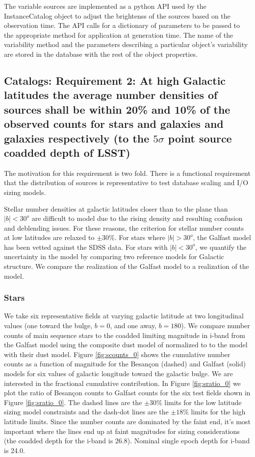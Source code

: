 \documentclass[]{article}
\begin{document}
{The variable sources are implemented as a python API used by the InstanceCatalog object to adjust the brightenss of the sources based on the observation time.
The API calls for a dictionary of parameters to be passed to the appropriate method for application at generation time.  The name of the variability method and
the parameters describing a particular object's variability are stored in the database with the rest of the object properties.

\subsection{Catalogs: Requirement 2: At high Galactic latitudes the
  average number densities of sources shall be within 20\%
  and 10\% 
  of the observed counts for stars and galaxies and galaxies
  respectively (to the $5\sigma$ point source coadded depth
  of LSST)}
The motivation for this requirement is two fold.  There is a functional requirement that the distribution of sources is representative
to test database scaling and I/O sizing models.  

Stellar number densities at galactic latitudes closer than to the plane than $|b| < 30^o$ are difficult to model due to the rising density and resulting confusion and deblending issues.
For these reasons, the criterion for stellar number counts at low latitudes are relaxed to $\pm 30\%$. 
For stars where $|b| > 30^o$, the Galfast model has been vetted against the SDSS data.  For stars with $|b| < 30^o$, we quantify the uncertainty in the model by comparing two reference models for Galactic structure.
We compare the realization of the Galfast model to a realization of the \citet{besancon} model.

\subsubsection{Stars}
We take six representative fields at varying galactic latitude at two longitudinal values (one toward the bulge, $b=0$, and one away, $b=180$).  
We compare number 
counts of main sequence stars to the coadded limiting magnitude in i-band 
 from the Galfast model using the composite dust model
of \citet{amores05} normalized to \citet{schlegel98} to the \citet{besancon} model with their dust model.  Figure \ref{fig:scounts_0} shows 
the cumulative number counts as a function of magnitude for the Besan\c{c}on (dashed) and Galfast (solid) models 
for six values of galactic longitude toward the galactic bulge.  We are interested in the
fractional cumulative contribution.  In Figure \ref{fig:sratio_0} we plot the ratio of Besan\c{c}on counts to Galfast counts for the six test fields shown in Figure \ref{fig:sratio_0}.
The dashed lines are the $\pm30\%$ limits for the low latitude sizing model constraints and the dash-dot lines are the $\pm18\%$ limits for the high latitude limits.
Since the number counts are dominated by the faint end, it's most important where the lines end up at faint magnitudes for sizing considerations 
(the coadded depth for the i-band is 26.8).  
Nominal single epoch depth for i-band is 24.0.  

}
\end{document}
